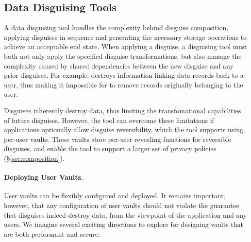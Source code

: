 \subsection{Data Disguising Tools}
\label{sec:tool}

A data disguising tool handles the complexity behind disguise composition, applying disguises in
sequence and generating the necessary storage operations to achieve an acceptable end state.  When
applying a disguise, a disguising tool must both not only apply the specified disguise
transformations, but also manage the complexity caused by shared dependencies between the new
disguise and any prior disguises. For example, \ca destroys information linking data records back
to a user, thus making it impossible for \gdpr to remove records originally belonging to the user.

Disguises inherently destroy data, thus limiting the transfomational capabilities of future
disguises. However, the tool can overcome these limitations if applications optionally allow
disguise reversibility, which the tool supports using per-user vaults. These vaults store per-user
revealing functions for reversible disguises, and enable the tool to support a
larger set of privacy policies (\S\ref{sec:composition}).



\paragraph{Deploying User Vaults.}
User vaults can be flexibly configured and deployed. It remains important, however, that any
configuration of user vaults should not violate the guarantee that disguises indeed destroy data,
from the viewpoint of the application and any users.
We imagine several exciting directions to explore for designing vaults that are both
performant and secure.
%

